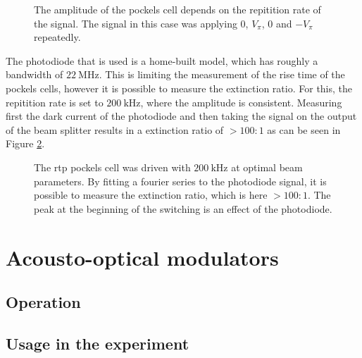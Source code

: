 \begin{figure}[h]
\label{fig:eom_strange}
\caption{The amplitude of the pockels cell depends on the repitition rate of the signal. The signal in this case was applying $0$, $V_\pi$, $0$ and $-V_\pi$ repeatedly.}
\end{figure}

The photodiode that is used is a home-built model, which has roughly a bandwidth of $\SI{22}{\mega \hertz}$. This is limiting the measurement of the rise time of the pockels cells, however it is possible to measure the extinction ratio. For this, the repitition rate is set to $\SI{200}{\kilo \hertz}$, where the amplitude is consistent. Measuring first the dark current of the photodiode and then taking the signal on the output of the beam splitter results in a extinction ratio of $>100:1$ as can be seen in Figure \ref{fig:eom_rtp_extc}.

\begin{figure}[h]
\label{fig:eom_rtp_extc}
\caption{The \ac{rtp} pockels cell was driven with $\SI{200}{\kilo\hertz}$ at optimal beam parameters. By fitting a fourier series to the photodiode signal, it is possible to measure the extinction ratio, which is here $>100:1$. The peak at the beginning of the switching is an effect of the photodiode.}
\end{figure}


\section{Acousto-optical modulators}
	\subsection{Operation}
	\subsection{Usage in the experiment}

